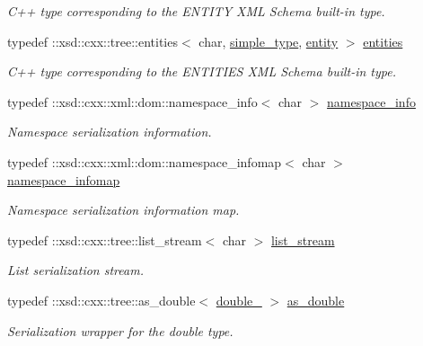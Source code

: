 \begin{DoxyCompactItemize}
\begin{DoxyCompactList}\small\item\em C++ type corresponding to the E\+N\+T\+I\+T\+Y X\+M\+L Schema built-\/in type. \end{DoxyCompactList}\item 
typedef \+::xsd\+::cxx\+::tree\+::entities$<$ char, \hyperlink{namespacexml__schema_a44789bb4367951bcf8ae867cb983324d}{simple\+\_\+type}, \hyperlink{namespacexml__schema_a871d3ae7ead81c6fc7ff7d37cd5f4c8f}{entity} $>$ \hyperlink{namespacexml__schema_ad9a0d0d60ff45d5f4a4086a502b9599b}{entities}
\begin{DoxyCompactList}\small\item\em C++ type corresponding to the E\+N\+T\+I\+T\+I\+E\+S X\+M\+L Schema built-\/in type. \end{DoxyCompactList}\item 
typedef \+::xsd\+::cxx\+::xml\+::dom\+::namespace\+\_\+info$<$ char $>$ \hyperlink{namespacexml__schema_a21061cbf10bfd5a1c98489f10429786e}{namespace\+\_\+info}
\begin{DoxyCompactList}\small\item\em Namespace serialization information. \end{DoxyCompactList}\item 
typedef \+::xsd\+::cxx\+::xml\+::dom\+::namespace\+\_\+infomap$<$ char $>$ \hyperlink{namespacexml__schema_ad52b6e3505153cb30ba3452f7868450e}{namespace\+\_\+infomap}
\begin{DoxyCompactList}\small\item\em Namespace serialization information map. \end{DoxyCompactList}\item 
typedef \+::xsd\+::cxx\+::tree\+::list\+\_\+stream$<$ char $>$ \hyperlink{namespacexml__schema_ab6c818ac91e70a25620375e0d000be83}{list\+\_\+stream}
\begin{DoxyCompactList}\small\item\em List serialization stream. \end{DoxyCompactList}\item 
typedef \+::xsd\+::cxx\+::tree\+::as\+\_\+double$<$ \hyperlink{namespacexml__schema_aac2d3d3483d3a20e8d96d2e8e5b3a470}{double\+\_\+} $>$ \hyperlink{namespacexml__schema_ae0eab1db5641db3b286a63a0ebe40351}{as\+\_\+double}
\begin{DoxyCompactList}\small\item\em Serialization wrapper for the double type. \end{DoxyCompactList}\item 

\end{DoxyCompactItemize}
